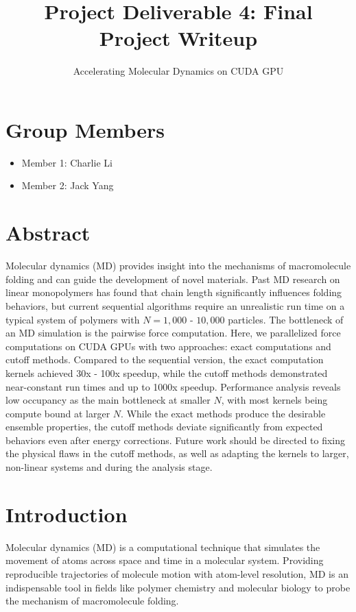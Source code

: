 \documentclass[12pt]{article}
\title{Project Deliverable 4: Final Project Writeup}
\author{Accelerating Molecular Dynamics on CUDA GPU}
\date{}
\begin{document}
\maketitle

\section*{Group Members}
\begin{itemize}
    \item Member 1: Charlie Li
    \item Member 2: Jack Yang
\end{itemize}

\section{Abstract}
Molecular dynamics (MD) provides insight into the mechanisms of macromolecule folding and can guide the development of novel materials. Past MD research on linear monopolymers has found that chain length significantly influences folding behaviors, but current sequential algorithms require an unrealistic run time on a typical system of polymers with $N=1,000$ - $10,000$ particles. The bottleneck of an MD simulation is the pairwise force computation. Here, we parallelized force computations on CUDA GPUs with two approaches: exact computations and cutoff methods. Compared to the sequential version, the exact computation kernels achieved 30x - 100x speedup, while the cutoff methods demonstrated near-constant run times and up to 1000x speedup. Performance analysis reveals low occupancy as the main bottleneck at smaller $N$, with most kernels being compute bound at larger $N$. While the exact methods produce the desirable ensemble properties, the cutoff methods deviate significantly from expected behaviors even after energy corrections. Future work should be directed to fixing the physical flaws in the cutoff methods, as well as adapting the kernels to larger, non-linear systems and during the analysis stage.

\section{Introduction} \label{sec:intro}
Molecular dynamics (MD) is a computational technique that simulates the movement of atoms across space and time in a molecular system. Providing reproducible trajectories of molecule motion with atom-level resolution, MD is an indispensable tool in fields like polymer chemistry and molecular biology to probe the mechanism of macromolecule folding.
\end{document}
